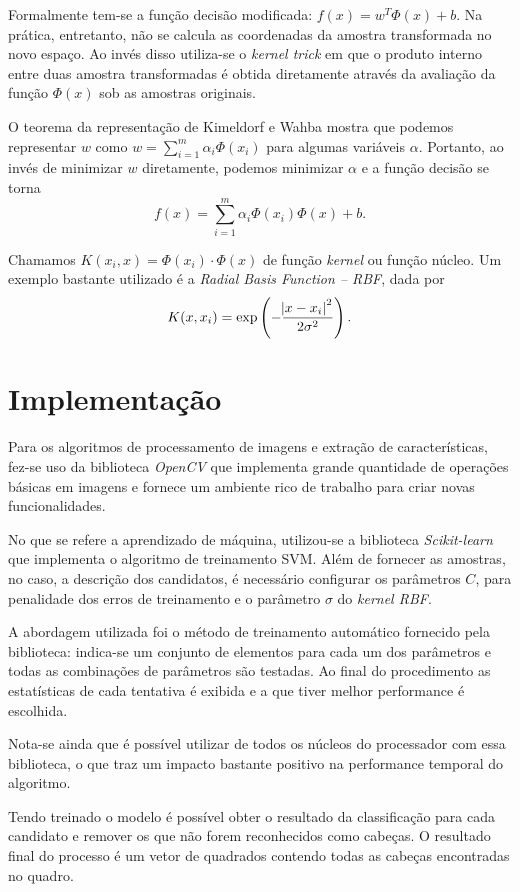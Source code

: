 Formalmente tem-se a função decisão modificada: $f(x)=w^T \Phi(x) +b$.  Na prática, entretanto, não se calcula as coordenadas da amostra transformada no novo espaço. Ao invés disso utiliza-se o \textit{kernel trick} em que o produto interno entre duas amostra transformadas é obtida diretamente através da avaliação da função $\Phi(x)$ sob as amostras originais.

O teorema da representação de Kimeldorf e Wahba mostra que podemos representar $w$ como $w=\sum_{i=1}^m \alpha_i \Phi(x_i)$ para algumas variáveis $\alpha$. Portanto, ao invés de minimizar $w$ diretamente, podemos minimizar $\alpha$ e a função decisão se torna
\begin{equation}
	\label{eq:svm-decision-func}
	f(x)=\sum_{i=1}^m \alpha_i \Phi(x_i) \Phi(x) +b.
\end{equation}

Chamamos $K(x_i, x) = \Phi(x_i) \cdot \Phi(x)$ de função \textit{kernel} ou função núcleo. Um exemplo bastante utilizado é a \textit{Radial Basis Function -- RBF}, dada por
\begin{equation}
	\label{eq:svm-kernel-func}
	K(x,x_i) = \exp\left(-\frac{\abs{x-x_i}^2}{2\sigma^2}\right).
\end{equation}

\section{Implementação}
Para os algoritmos de processamento de imagens e extração de características, fez-se uso da biblioteca \textit{OpenCV} que implementa grande quantidade de operações básicas em imagens e fornece um ambiente rico de trabalho para criar novas funcionalidades.

No que se refere a aprendizado de máquina, utilizou-se a biblioteca \textit{Scikit-learn} que implementa o algoritmo de treinamento SVM. Além de fornecer as amostras, no caso, a descrição dos candidatos, é necessário configurar os parâmetros $C$, para penalidade dos erros de treinamento e o parâmetro $\sigma$ do \textit{kernel RBF}. 

A abordagem utilizada foi o método de treinamento automático fornecido pela biblioteca: indica-se um conjunto de elementos para cada um dos parâmetros e todas as combinações de parâmetros são testadas. Ao final do procedimento as estatísticas de cada tentativa é exibida e a que tiver melhor performance é escolhida.

Nota-se ainda que é possível utilizar de todos os núcleos do processador com essa biblioteca, o que traz um impacto bastante positivo na performance temporal do algoritmo.

Tendo treinado o modelo é possível obter o resultado da classificação para cada candidato e remover os que não forem reconhecidos como cabeças. O resultado final do processo é um vetor de quadrados contendo todas as cabeças encontradas no quadro.

